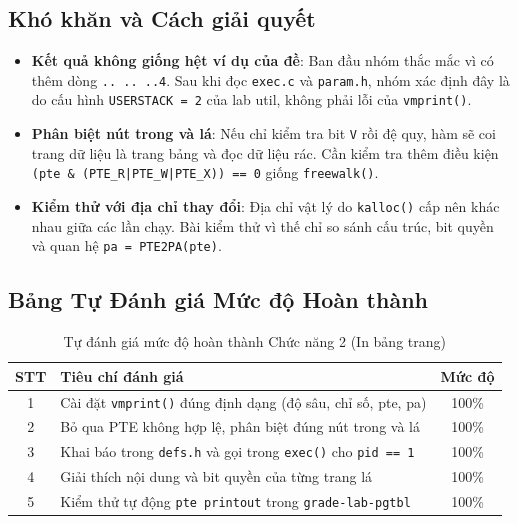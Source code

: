 \subsection{Khó khăn và Cách giải quyết}
\begin{itemize}
    \item \textbf{Kết quả không giống hệt ví dụ của đề}: Ban đầu nhóm thắc mắc vì có thêm dòng \texttt{.. .. ..4}. Sau khi đọc \texttt{exec.c} và \texttt{param.h}, nhóm xác định đây là do cấu hình \texttt{USERSTACK = 2} của lab util, không phải lỗi của \texttt{vmprint()}.
    \item \textbf{Phân biệt nút trong và lá}: Nếu chỉ kiểm tra bit \texttt{V} rồi đệ quy, hàm sẽ coi trang dữ liệu là trang bảng và đọc dữ liệu rác. Cần kiểm tra thêm điều kiện \texttt{(pte \& (PTE\_R|PTE\_W|PTE\_X)) == 0} giống \texttt{freewalk()}.
    \item \textbf{Kiểm thử với địa chỉ thay đổi}: Địa chỉ vật lý do \texttt{kalloc()} cấp nên khác nhau giữa các lần chạy. Bài kiểm thử vì thế chỉ so sánh cấu trúc, bit quyền và quan hệ \texttt{pa = PTE2PA(pte)}.
\end{itemize}

\subsection{Bảng Tự Đánh giá Mức độ Hoàn thành}
\begin{table}[h!]
    \centering
    \caption{Tự đánh giá mức độ hoàn thành Chức năng 2 (In bảng trang)}
    \label{tab:self_eval_vmprint}
    \begin{tabularx}{\textwidth}{c X c}
        \toprule
        \textbf{STT} & \textbf{Tiêu chí đánh giá} & \textbf{Mức độ} \\
        \midrule
        1 & Cài đặt \texttt{vmprint()} đúng định dạng (độ sâu, chỉ số, pte, pa) & 100\% \\
        2 & Bỏ qua PTE không hợp lệ, phân biệt đúng nút trong và lá & 100\% \\
        3 & Khai báo trong \texttt{defs.h} và gọi trong \texttt{exec()} cho \texttt{pid == 1} & 100\% \\
        4 & Giải thích nội dung và bit quyền của từng trang lá & 100\% \\
        5 & Kiểm thử tự động \texttt{pte printout} trong \texttt{grade-lab-pgtbl} & 100\% \\
        \bottomrule
    \end{tabularx}
\end{table}
